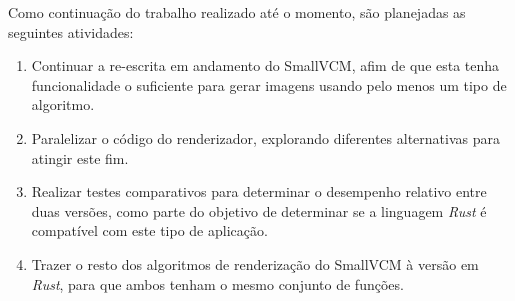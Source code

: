 \documentclass[tg]{mdtufsm}
\newcommand{\todo}[1]{\textsf{\color{red}#1}}
\begin{document}
\todo{Como continuação do trabalho realizado até o momento, são planejadas as seguintes atividades:}

\begin{enumerate}
	\item Continuar a re-escrita em andamento do SmallVCM, afim de que esta tenha funcionalidade o suficiente para gerar imagens usando pelo menos um tipo de algoritmo.
	\item Paralelizar o código do renderizador, explorando diferentes alternativas para atingir este fim.
	\item Realizar testes comparativos para determinar o desempenho relativo entre duas versões, como parte do objetivo de determinar se a linguagem \emph{Rust} é compatível com este tipo de aplicação.
	\item Trazer o resto dos algoritmos de renderização do SmallVCM à versão em \emph{Rust}, para que ambos tenham o mesmo conjunto de funções.
\end{enumerate}

\setlength{\baselineskip}{\baselineskip}


\end{document}
